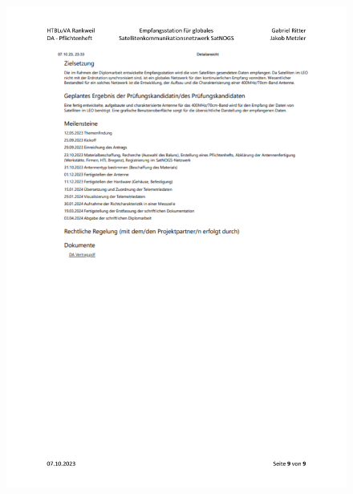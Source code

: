 \begin{figure}
	\centering
	\includegraphics[width=\textwidth]{../ref/DA_Metzler_Ritter_Pflichtenheft_v1.2.-page9pdf.pdf}
\end{figure}


\pagebreak

